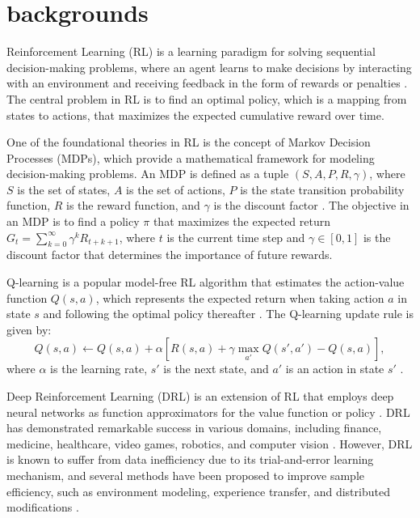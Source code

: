 \section{backgrounds}
Reinforcement Learning (RL) is a learning paradigm for solving sequential decision-making problems, where an agent learns to make decisions by interacting with an environment and receiving feedback in the form of rewards or penalties \cite{2001.09608}. The central problem in RL is to find an optimal policy, which is a mapping from states to actions, that maximizes the expected cumulative reward over time.

One of the foundational theories in RL is the concept of Markov Decision Processes (MDPs), which provide a mathematical framework for modeling decision-making problems. An MDP is defined as a tuple $(S, A, P, R, \gamma)$, where $S$ is the set of states, $A$ is the set of actions, $P$ is the state transition probability function, $R$ is the reward function, and $\gamma$ is the discount factor \cite{2108.11510}. The objective in an MDP is to find a policy $\pi$ that maximizes the expected return $G_t = \sum_{k=0}^{\infty} \gamma^k R_{t+k+1}$, where $t$ is the current time step and $\gamma \in [0, 1]$ is the discount factor that determines the importance of future rewards.

Q-learning is a popular model-free RL algorithm that estimates the action-value function $Q(s, a)$, which represents the expected return when taking action $a$ in state $s$ and following the optimal policy thereafter \cite{2303.08631}. The Q-learning update rule is given by:
\begin{equation}
Q(s, a) \leftarrow Q(s, a) + \alpha [R(s, a) + \gamma \max_{a'} Q(s', a') - Q(s, a)],
\end{equation}
where $\alpha$ is the learning rate, $s'$ is the next state, and $a'$ is an action in state $s'$ \cite{2106.01134}.

Deep Reinforcement Learning (DRL) is an extension of RL that employs deep neural networks as function approximators for the value function or policy \cite{2108.11510}. DRL has demonstrated remarkable success in various domains, including finance, medicine, healthcare, video games, robotics, and computer vision \cite{2108.11510}. However, DRL is known to suffer from data inefficiency due to its trial-and-error learning mechanism, and several methods have been proposed to improve sample efficiency, such as environment modeling, experience transfer, and distributed modifications \cite{2202.05135}.

